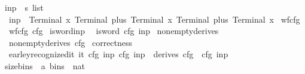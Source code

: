 \begin{isabellebody}
\isanewline
{}\isamarkupfalse%
\ inp{}\ {\isacharcolon}{\kern0pt}{\isacharcolon}{\kern0pt}\ {\isachardoublequoteopen}s{}\ list{\isachardoublequoteclose}\ \isanewline
\ \ {\isachardoublequoteopen}inp{}\ {\isacharequal}{\kern0pt}\ {\isacharbrackleft}{\kern0pt}Terminal\ x{\isacharcomma}{\kern0pt}\ Terminal\ plus{\isacharcomma}{\kern0pt}\ Terminal\ x{\isacharcomma}{\kern0pt}\ Terminal\ plus{\isacharcomma}{\kern0pt}\ Terminal\ x{\isacharbrackright}{\kern0pt}{\isachardoublequoteclose}\isanewline
\isanewline
{}\isamarkupfalse%
\ wf{\isacharunderscore}{\kern0pt}cfg{}{\isacharcolon}{\kern0pt}\isanewline
\ \ {\isachardoublequoteopen}wf{\isacharunderscore}{\kern0pt}cfg\ cfg{}{\isachardoublequoteclose}%
\isadelimproof
%
\endisadelimproof
%
\isatagproof
%
\endisatagproof
{\isafoldproof}%
%
\isadelimproof
\isanewline
%
\endisadelimproof
{}\isamarkupfalse%
\ is{\isacharunderscore}{\kern0pt}word{\isacharunderscore}{\kern0pt}inp{}{\isacharcolon}{\kern0pt}\isanewline
\ \ {\isachardoublequoteopen}is{\isacharunderscore}{\kern0pt}word\ cfg{}\ inp{}{\isachardoublequoteclose}%
\isadelimproof
%
\endisadelimproof
%
\isatagproof
%
\endisatagproof
{\isafoldproof}%
%
\isadelimproof
\isanewline
%
\endisadelimproof
{}\isamarkupfalse%
\ nonempty{\isacharunderscore}{\kern0pt}derives{}{\isacharcolon}{\kern0pt}\isanewline
\ \ {\isachardoublequoteopen}nonempty{\isacharunderscore}{\kern0pt}derives\ cfg{}{\isachardoublequoteclose}%
\isadelimproof
%
\endisadelimproof
%
\isatagproof
%
\endisatagproof
{\isafoldproof}%
%
\isadelimproof
\isanewline
%
\endisadelimproof
{}\isamarkupfalse%
\ correctness{}{\isacharcolon}{\kern0pt}\isanewline
\ \ {\isachardoublequoteopen}earley{\isacharunderscore}{\kern0pt}recognized{\isacharunderscore}{\kern0pt}it\ {\isacharparenleft}{\kern0pt}{\isasymII}{\isacharunderscore}{\kern0pt}it\ cfg{}\ inp{}{\isacharparenright}{\kern0pt}\ cfg{}\ inp{}\ {\isasymlongleftrightarrow}\ derives\ cfg{}\ {\isacharbrackleft}{\kern0pt}{\isasymSS}\ cfg{}{\isacharbrackright}{\kern0pt}\ inp{}{\isachardoublequoteclose}%
\isadelimproof
%
\endisadelimproof
%
\isatagproof
%
\endisatagproof
{\isafoldproof}%
%
\isadelimproof
\isanewline
%
\endisadelimproof
{}\isamarkupfalse%
\ size{\isacharunderscore}{\kern0pt}bins\ {\isacharcolon}{\kern0pt}{\isacharcolon}{\kern0pt}\ {\isachardoublequoteopen}{\isacharprime}{\kern0pt}a\ bins\ {\isasymRightarrow}\ nat{\isachardoublequoteclose}\ \isanewline

\end{isabellebody}
